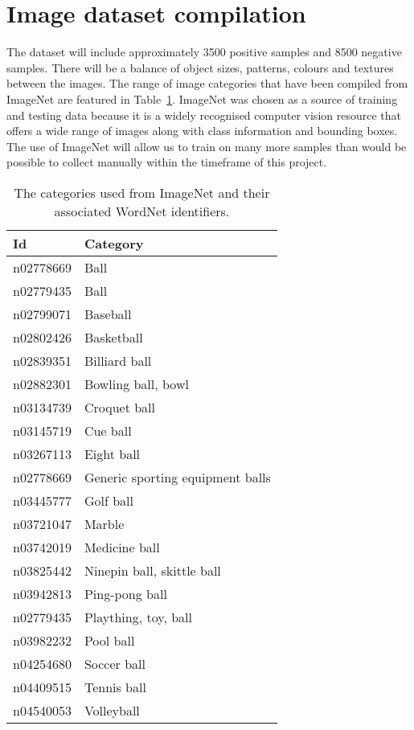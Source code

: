 \documentclass{llncs}
\begin{document}
    \section{Image dataset compilation} {
    \label{sec:dataset}

        The dataset will include approximately 3500 positive samples and 8500 negative samples. There will be a balance of object sizes, patterns, colours and textures between the images. The range of image categories that have been compiled from ImageNet are featured in Table~\ref{tab:imagenet}. ImageNet was chosen as a
        source of training and testing data because it is a widely recognised computer vision resource that offers a wide range of images along with class information and bounding boxes. The use of ImageNet will allow us to train on many more samples than would be possible to collect manually within the timeframe of this project.

        \begin{table}[h]
        \centering
        \caption{The categories used from ImageNet and their associated WordNet \citep{fellbaum1998wordnet} identifiers.}
        \label{tab:imagenet}
        \begin{tabularx}{\textwidth}{lX}
            \toprule
            \textbf{Id} & \textbf{Category} \\
            \midrule
            n02778669 & Ball \\
            n02779435 & Ball \\
            n02799071 & Baseball \\
            n02802426 & Basketball \\
            n02839351 & Billiard ball \\
            n02882301 & Bowling ball, bowl \\
            n03134739 & Croquet ball \\
            n03145719 & Cue ball \\
            n03267113 & Eight ball \\
            n02778669 & Generic sporting equipment balls \\
            n03445777 & Golf ball \\
            n03721047 & Marble \\
            n03742019 & Medicine ball \\
            n03825442 & Ninepin ball, skittle ball \\
            n03942813 & Ping-pong ball \\
            n02779435 & Plaything, toy, ball \\
            n03982232 & Pool ball \\
            n04254680 & Soccer ball \\
            n04409515 & Tennis ball \\
            n04540053 & Volleyball \\
            \bottomrule
        \end{tabularx}
        \end{table}

    }
\end{document}
